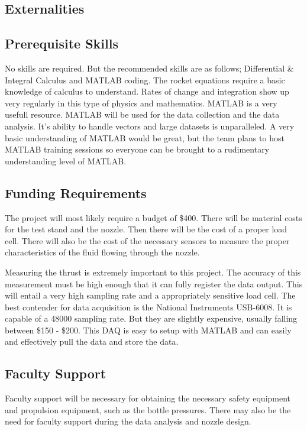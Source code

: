 \documentclass[conference]{IEEEtran} %
\begin{document}
\begin{}
\section{Externalities}
\subsection{Prerequisite Skills}
No skills are required. But the recommended skills are as follows; Differential \& Integral Calculus and MATLAB coding. The rocket equations
require a basic knowledge of calculus to understand. Rates of change and integration show up very regularly in this type of physics and mathematics. MATLAB
is a very usefull resource. MATLAB will be used for the data collection and the data analysis. It's ability to handle vectors and large datasets is unparalleled.
A very basic understanding of MATLAB would be great, but the team plans to host MATLAB training sessions so everyone can be brought to a rudimentary understanding
level of MATLAB.

\subsection{Funding Requirements}
The project will most likely require a budget of \$400. There will be material costs for the test stand and the nozzle.
Then there will be the cost of a proper load cell. There will also be the cost of the necessary sensors to measure
 the proper characteristics of the fluid flowing through the nozzle.

Measuring the thrust is extremely important to this project. The accuracy of this measurement must be high enough that it can fully register the data output. This will
entail a very high sampling rate and a appropriately sensitive load cell. The best contender for data acquisition is the National Instruments USB-6008. It is capable of
a 48000 sampling rate. But they are slightly expensive, usually falling between \$150 - \$200. This DAQ is easy to setup with MATLAB and can easily and effectively pull the data and
store the data.

\subsection{Faculty Support}
Faculty support will be necessary for obtaining the necessary safety equipment and propulsion equipment, such as the bottle pressures.
There may also be the need for faculty support during the data analysis and nozzle design.


\end{}
\end{document}
